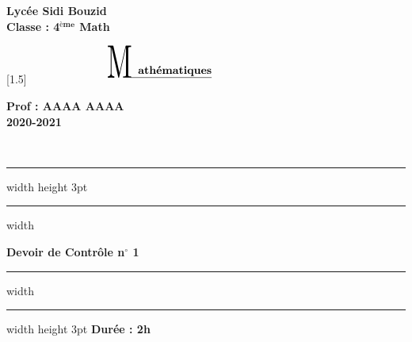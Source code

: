 \documentclass[12pt,a4paper]{article}
\newcommand\mathl{\scalebox{1.25}[1.5]{$
\mathrel{\ThisStyle{\abovebaseline[1\LMex]{%
\ensurestackMath{\stackanchor[-3.8\LMex]{\SavedStyle \scalebox{2.5}[4.25]{M}}{%
\SavedStyle\hspace*{3.3cm} \underline{\ \ \textbf{athématiques}}}}}}}$}}
\begin{document}
\noindent
\begin{minipage}{0.23\textwidth}
\bfseries Lycée Sidi Bouzid \\[0.3cm]
Classe : 4$^\textbf{ème}$ Math
\end{minipage}
\begin{minipage}{0.3\textwidth}
\mathl
\end{minipage}
\hfill
\begin{minipage}{0.3\textwidth}
\begin{flushright}
\bfseries Prof : AAAA AAAA \\[0.3cm]
2020-2021
\end{flushright}
\end{minipage}\\[0.1cm]
\hrule width \hsize height 3pt \kern 0.7mm \hrule width \hsize \vskip2mm
\begin{center}
{\Large \textbf{Devoir de Contrôle n$^\circ$ 1}}
\end{center}
\hrule width \hsize \kern 0.7mm \hrule width \hsize height 3pt \vskip2mm
\hfill \textbf{Durée : 2h}
\end{document}
